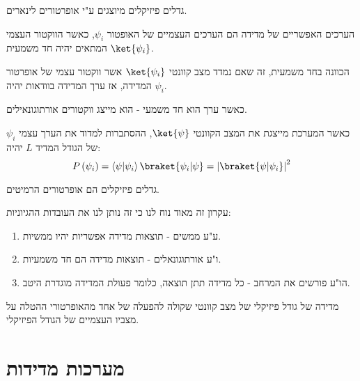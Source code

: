 \documentclass{tstextbook}
\begin{document}
\begin{proposition}
גדלים פיזיקלים מיוצגים ע"י אופרטורים לינארים.

\end{proposition}
\begin{proposition}
הערכים האפשריים של מדידה הם הערכים העצמיים של האופטור \(\psi_{i}\), כאשר הווקטור העצמי המתאים יהיה חד משמעית \(\ket{\psi_{i}}\).

\end{proposition}
\begin{remark}
הכוונה בחד משמעית, זה שאם נמדד מצב קוונטי \(\ket{\psi_{i}}\) אשר ווקטור עצמי של אופרטור המדידה, אז ערך המדידה בוודאות יהיה \(\psi_{i}\). 

\end{remark}
\begin{proposition}
כאשר ערך הוא חד משמעי - הוא מייצג ווקטורים אורתוגונאילים.

\end{proposition}
\begin{proposition}
כאשר המערכת מייצגת את המצב הקוונטי \(\ket{\psi}\), ההסתברות למדוד את הערך עצמי \(\psi_{i}\) של הגודל המדיד \(L\) יהיה:
$$P\left( \psi_{i} \right)=\left\langle  \psi | \psi_{i}  \right\rangle \braket{ \psi_{i} | \psi }= \left\lvert  \braket{ \psi | \psi_{i} }  \right\rvert ^2 $$

\end{proposition}
\begin{theorem}
גדלים פיזיקלים הם אופרטורים הרמיטים.

\end{theorem}
עקרון זה מאוד נוח לנו כי זה נותן לנו את העובדות ההגיוניות:

\begin{enumerate}
  \item ע"ע ממשים - תוצאות מדידה אפשריות יהיו ממשיות. 


  \item ו"ע אורתוגונאלים - תוצאות מדידה הם חד משמעיות. 


  \item הו"ע פורשים את המרחב - כל מדידה תתן תוצאה, כלומר פעולת המדידה מוגדרת היטב. 


\end{enumerate}
\begin{theorem}
מדידה של גודל פיזיקלי של מצב קוונטי שקולה להפעלה של אחד מהאופרטורי ההטלה על מצביו העצמיים של הגודל הפיזיקלי.

\end{theorem}
\section{מערכות מדידות}
\end{document}
